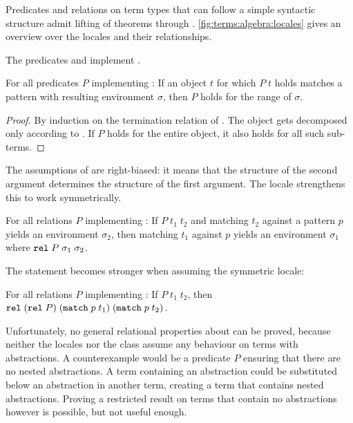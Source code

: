 \noindent
Predicates and relations on term types that can follow a simple syntactic structure admit lifting of theorems through .
\cref{fig:terms:algebra:locales} gives an overview over the locales and their relationships.

\begin{corollary}
  The predicates  and  implement .
\end{corollary}

\begin{lemma}\label{thm:terms:algebra:preds:match}
  For all predicates $P$ implementing :
  If an object $t$ for which $P\;t$ holds matches a pattern with resulting environment $\sigma$, then $P$ holds for the range of $\sigma$.
\end{lemma}

\begin{proof}
  By induction on the termination relation of .
  The object gets decomposed only according to .
  If $P$ holds for the entire object, it also holds for all such sub-terms.
\end{proof}

\noindent
The assumptions of  are right-biased:
it means that the structure of the second argument determines the structure of the first argument.
The locale  strengthens this to work symmetrically.

\begin{lemma}
  For all relations $P$ implementing :
  If $P\;t_1\;t_2$ and matching $t_2$ against a pattern $p$ yields an environment $\sigma_2$, then matching $t_1$ against $p$ yields an environment $\sigma_1$ where $\texttt{\textup{rel}}\;P\;\sigma_1\;\sigma_2$.
\end{lemma}

\noindent
The statement becomes stronger when assuming the symmetric locale:
\begin{lemma}\label{thm:terms:algebra:match-rel}
  For all relations $P$ implementing :
  If $P\;t_1\;t_2$, then $\texttt{\textup{rel}}\;(\texttt{\textup{rel}}\;P)\;(\texttt{\textup{match}}\;p\;t_1)\;(\texttt{\textup{match}}\;p\;t_2)$.
\end{lemma}

\noindent
Unfortunately, no general relational properties about  can be proved, because neither the locales nor the  class assume any behaviour on terms with abstractions.
A counterexample would be a predicate $P$ ensuring that there are no nested abstractions.
A term containing an abstraction could be substituted below an abstraction in another term, creating a term that contains nested abstractions.
Proving a restricted result on terms that contain no abstractions however is possible, but not useful enough.

